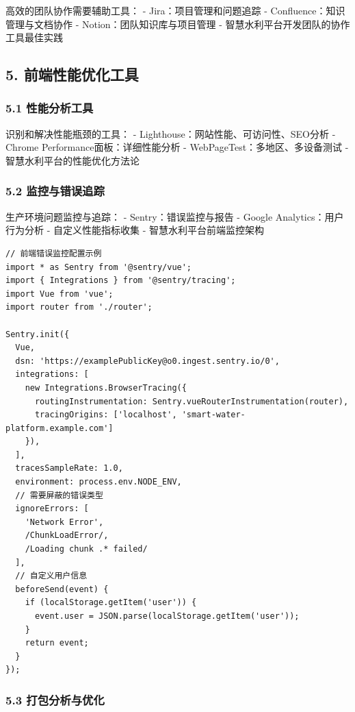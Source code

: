 高效的团队协作需要辅助工具： - Jira：项目管理和问题追踪 -
Confluence：知识管理与文档协作 - Notion：团队知识库与项目管理 -
智慧水利平台开发团队的协作工具最佳实践

\subsection{5.
前端性能优化工具}\label{ux524dux7aefux6027ux80fdux4f18ux5316ux5de5ux5177}

\subsubsection{5.1
性能分析工具}\label{ux6027ux80fdux5206ux6790ux5de5ux5177}

识别和解决性能瓶颈的工具： - Lighthouse：网站性能、可访问性、SEO分析 -
Chrome Performance面板：详细性能分析 - WebPageTest：多地区、多设备测试 -
智慧水利平台的性能优化方法论

\subsubsection{5.2
监控与错误追踪}\label{ux76d1ux63a7ux4e0eux9519ux8befux8ffdux8e2a}

生产环境问题监控与追踪： - Sentry：错误监控与报告 - Google
Analytics：用户行为分析 - 自定义性能指标收集 - 智慧水利平台前端监控架构

\begin{lstlisting}
// 前端错误监控配置示例
import * as Sentry from '@sentry/vue';
import { Integrations } from '@sentry/tracing';
import Vue from 'vue';
import router from './router';

Sentry.init({
  Vue,
  dsn: 'https://examplePublicKey@o0.ingest.sentry.io/0',
  integrations: [
    new Integrations.BrowserTracing({
      routingInstrumentation: Sentry.vueRouterInstrumentation(router),
      tracingOrigins: ['localhost', 'smart-water-platform.example.com']
    }),
  ],
  tracesSampleRate: 1.0,
  environment: process.env.NODE_ENV,
  // 需要屏蔽的错误类型
  ignoreErrors: [
    'Network Error',
    /ChunkLoadError/,
    /Loading chunk .* failed/
  ],
  // 自定义用户信息
  beforeSend(event) {
    if (localStorage.getItem('user')) {
      event.user = JSON.parse(localStorage.getItem('user'));
    }
    return event;
  }
});
\end{lstlisting}

\subsubsection{5.3
打包分析与优化}\label{ux6253ux5305ux5206ux6790ux4e0eux4f18ux5316}

